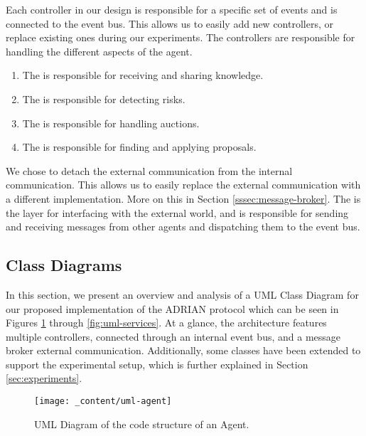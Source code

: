 Each controller in our design is responsible for a specific set of events and is connected to the event bus. This allows us to easily add new controllers, or replace existing ones during our experiments. The controllers are responsible for handling the different aspects of the agent. 

\begin{enumerate}
    \item The  is responsible for receiving and sharing knowledge. 
    \item The  is responsible for detecting risks.
    \item The  is responsible for handling auctions. 
    \item The  is responsible for finding and applying proposals.
\end{enumerate}

We chose to detach the external communication from the internal communication. This allows us to easily replace the external communication with a different implementation. More on this in Section \ref{sssec:message-broker}.
The  is the layer for interfacing with the external world, and is responsible for sending and receiving messages from other agents and dispatching them to the event bus.

\subsection{Class Diagrams}
\label{ssec:class-diagrams}

In this section, we present an overview and analysis of a UML Class Diagram for our proposed implementation of the ADRIAN protocol which can be seen in Figures \ref{fig:uml-agent} through \ref{fig:uml-services}. At a glance, the architecture features multiple controllers, connected through an internal event bus, and a message broker external communication. Additionally, some classes have been extended to support the experimental setup, which is further explained in Section \ref{sec:experiments}.

\begin{figure}[H]
    \centering
    \texttt{[image: \_content/uml-agent]}
    \caption{UML Diagram of the code structure of an Agent.}
    \label{fig:uml-agent}
\end{figure}

